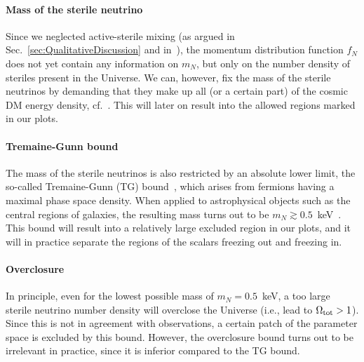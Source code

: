 \paragraph{Mass of the sterile neutrino}
Since we neglected active-sterile mixing (as argued in Sec.~\ref{sec:QualitativeDiscussion} and in~\cite{Merle:2015vzu}), the momentum distribution function $f_N$ does not yet contain any information on $m_N$, but only on the number density of steriles present in the Universe. We can, however, fix the mass of the sterile neutrinos by demanding that they make up all (or a certain part) of the cosmic DM energy density, cf.~. This will later on result into the allowed regions marked in our plots.

\paragraph{Tremaine-Gunn bound}
The mass of the sterile neutrinos is also restricted by an absolute lower limit, the so-called Tremaine-Gunn (TG) bound~\cite{Tremaine:1979we}, which arises from fermions having a maximal phase space density. When applied to astrophysical objects such as the central regions of galaxies, the resulting mass turns out to be $m_N \gtrsim 0.5$~keV~\cite{Boyarsky:2008xj}. This bound will result into a relatively large excluded region in our plots, and it will in practice separate the regions of the scalars freezing out and freezing in.

\paragraph{Overclosure}
In principle, even for the lowest possible mass of $m_N = 0.5$~keV, a too large sterile neutrino number density will overclose the Universe (i.e., lead to $\Omega_{\rm tot} > 1$). Since this is not in agreement with observations, a certain patch of the parameter space is excluded by this bound. However, the overclosure bound turns out to be irrelevant in practice, since it is inferior compared to the TG bound.

